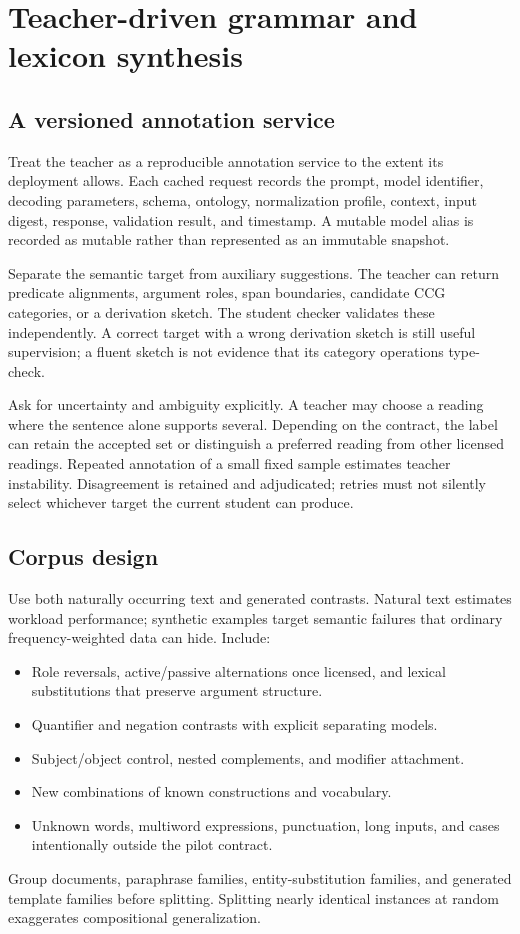\documentclass[11pt,a4paper]{article}
\begin{document}
\section{Teacher-driven grammar and lexicon synthesis}\label{sec:synthesis}

\subsection{A versioned annotation service}
Treat the teacher as a reproducible annotation service to the extent its
deployment allows. Each cached request records the prompt, model identifier,
decoding parameters, schema, ontology, normalization profile, context,
input digest, response, validation result, and timestamp. A mutable model
alias is recorded as mutable rather than represented as an immutable
snapshot.

Separate the semantic target from auxiliary suggestions. The teacher can
return predicate alignments, argument roles, span boundaries, candidate CCG
categories, or a derivation sketch. The student checker validates these
independently. A correct target with a wrong derivation sketch is still useful
supervision; a fluent sketch is not evidence that its category operations
type-check.

Ask for uncertainty and ambiguity explicitly. A teacher may choose a reading
where the sentence alone supports several. Depending on the contract, the
label can retain the accepted set or distinguish a preferred reading from
other licensed readings. Repeated annotation of a small fixed sample
estimates teacher instability. Disagreement is retained and adjudicated;
retries must not silently select whichever target the current student can
produce.

\subsection{Corpus design}
Use both naturally occurring text and generated contrasts. Natural text
estimates workload performance; synthetic examples target semantic failures
that ordinary frequency-weighted data can hide. Include:
\begin{itemize}
  \item Role reversals, active/passive alternations once licensed, and
  lexical substitutions that preserve argument structure.
  \item Quantifier and negation contrasts with explicit separating models.
  \item Subject/object control, nested complements, and modifier attachment.
  \item New combinations of known constructions and vocabulary.
  \item Unknown words, multiword expressions, punctuation, long inputs,
  and cases intentionally outside the pilot contract.
\end{itemize}
Group documents, paraphrase families, entity-substitution families, and
generated template families before splitting. Splitting nearly identical
instances at random exaggerates compositional generalization.
\end{document}
